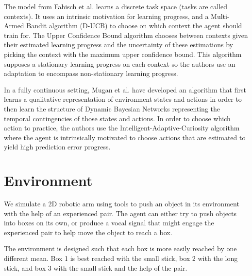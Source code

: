 \documentclass[conference]{include/IEEEtran}
\begin{document}
		The model from Fabisch et al. \cite{fabisch2014active} learns a discrete task space (tasks are called contexts).
		It uses an intrinsic motivation for learning progress, and a Multi-Armed Bandit algorithm (D-UCB) to choose on which context the agent should train for.
		The Upper Confidence Bound algorithm chooses between contexts given their estimated learning progress and the uncertainty of these estimations
		by picking the context with the maximum upper confidence bound.
		This algorithm supposes a stationary learning progress on each context so the authors use an adaptation 
		\cite{kocsis2006discounted} to encompass non-stationary learning progress.
		
		In a fully continuous setting, Mugan et al. \cite{mugan} have developed an algorithm that first learns a qualitative representation of environment states
		and actions in order to then learn the structure of Dynamic Bayesian Networks representing the temporal contingencies of those states and actions.
		In order to choose which action to practice, the authors use the Intelligent-Adaptive-Curiosity algorithm \cite{oudeyer_intrinsic_2007} where the agent 
		is intrinsically motivated to choose actions that are estimated to yield high prediction error progress.
		
%


\section{Environment}
\label{sec:env}

	We simulate a 2D robotic arm using tools to push an object in its environment with the help of an experienced pair. 
	The agent can either try to push objects into boxes on its own, or produce a vocal signal that might engage the experienced pair to help move the object to reach a box.
	
	The environment is designed such that each box is more easily reached by one different mean.
	Box 1 is best reached with the small stick, box 2 with the long stick, and box 3 with the small stick and the help of the pair.
	
\end{document}

